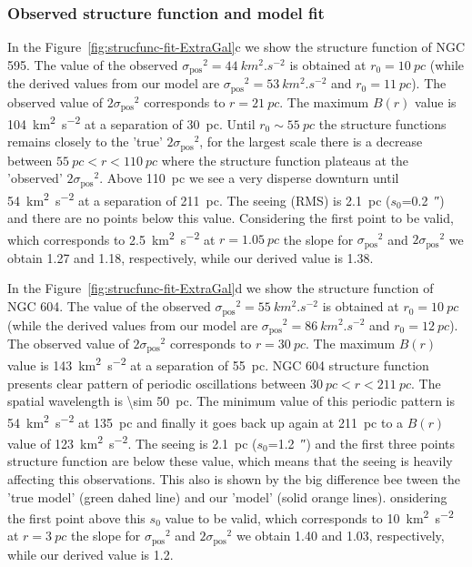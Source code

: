 \documentclass[fleqn,usenatbib, useAMS, a4paper]{mnras}
\newcommand\pos{\ensuremath{_{\mathrm{pos}}}}
\begin{document}
\subsubsection{Observed structure function and model fit}
\label{sec:observ-struct-funct-m33}

In the Figure~\ref{fig:strucfunc-fit-ExtraGal}c we show the structure function of NGC 595.
The value of the observed \(\sigma\pos^2 = \SI{44}{km^{2}.s^{-2}}\) is obtained at \(r_0 = \SI{10}{pc} \) (while the derived values from our model are \(\sigma\pos^2 = \SI{53}{km^{2}.s^{-2}}\) and \(r_0 = \SI{11}{pc} \)).
The observed value of \(2\sigma\pos^2\) corresponds to \(r = \SI{21}{pc} \).
The maximum \(B(r)\) value is \SI{104}{km^{2}.s^{-2}} at a separation of \SI{30}{pc}. 
Until \(r_0 \sim \SI{55}{pc} \) the structure functions remains closely to the 'true' \(2\sigma\pos^2\), for the largest scale there is a decrease between  \(\SI{55}{pc} < r < \SI{110}{pc} \) where the structure function plateaus at the 'observed' \(2\sigma\pos^2\). 
Above \SI{110}{pc} we see a very disperse downturn  until \SI{54}{km^{2}.s^{-2}} at a separation of \SI{211}{pc}.
The seeing (RMS) is \SI{2.1}{pc} (\(s_0\)=\SI{0.2}{\arcsecond}) and there are no points below this value.
Considering the first point to be valid, which corresponds to \SI{2.5}{km^{2}.s^{-2}} at \(r = \SI{1.05}{pc} \) the slope for \(\sigma\pos^2\) and \(2\sigma\pos^2\) we obtain \num{1.27} and \num{1.18}, respectively, while our derived value is \num{1.38}.

In the Figure~\ref{fig:strucfunc-fit-ExtraGal}d we show the structure function of NGC 604.
The value of the observed \(\sigma\pos^2 = \SI{55}{km^{2}.s^{-2}}\) is obtained at \(r_0 = \SI{10}{pc} \) (while the derived values from our model are \(\sigma\pos^2 = \SI{86}{km^{2}.s^{-2}}\) and \(r_0 = \SI{12}{pc} \)).
The observed value of \(2\sigma\pos^2\) corresponds to \(r = \SI{30}{pc} \).
The maximum \(B(r)\) value is \SI{143}{km^{2}.s^{-2}} at a separation of \SI{55}{pc}. 
NGC 604 structure function presents clear pattern of periodic oscillations between  \(\SI{30}{pc} < r < \SI{211}{pc} \).
The spatial wavelength is \SI{ \sim 50}{pc}. 
The minimum value of this periodic pattern is \SI{54}{km^{2}.s^{-2}} at \SI{135}{pc} 
and finally it goes back up again at \SI{211}{pc} to a \(B(r)\) value of \SI{123}{km^{2}.s^{-2}}.
The seeing is \SI{2.1}{pc} (\(s_0\)=\SI{1.2}{\arcsecond}) and the first three points structure function are below these value, which means that the seeing is heavily affecting this observations.
This also is shown by the big difference bee tween the 'true model' (green dahed line) and our 'model' (solid orange lines).
onsidering the first point above this \(s_0\) value to be valid, which corresponds to \SI{10}{km^{2}.s^{-2}} at \(r = \SI{3}{pc} \) the slope for \(\sigma\pos^2\) and \(2\sigma\pos^2\) we obtain \num{1.40} and \num{1.03}, respectively, while our derived value is \num{1.2}.
\end{document}

